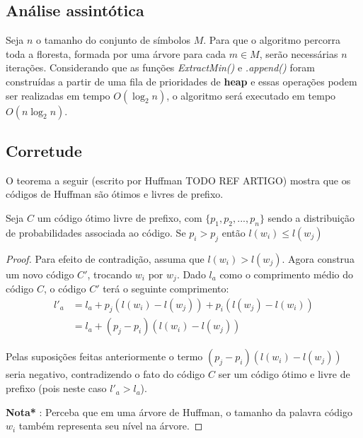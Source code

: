 \subsection{Análise assintótica}

Seja $n$ o tamanho do conjunto de símbolos $M$. Para que o algoritmo percorra toda a floresta, formada por uma árvore para cada $m \in M$, serão necessárias $n$ iterações. Considerando que as funções \emph{ExtractMin()} e \emph{.append()} foram construídas a partir de uma fila de prioridades de \textbf{heap} e essas operações podem ser realizadas em tempo $O(\log_2 n)$, o algoritmo será executado em tempo $O(n\log_2 n)$.

\subsection{Corretude}
O teorema a seguir (escrito por Huffman TODO REF ARTIGO) mostra  que os códigos de Huffman são ótimos e livres de prefixo.


\begin{lemma} \label{lemma:dist_prob_avg_size} Seja $C$ um código ótimo livre de prefixo, com $\{ p_1, p_2,..., p_n\}$ sendo a distribuição de probabilidades associada ao código. 
Se $p_i > p_j$ então $l(w_i) \leq l(w_j)$

\begin{proof} 
Para efeito de contradição, assuma que $l(w_i) > l(w_j)$. 
Agora construa um novo código $C'$, trocando $w_i$ por $w_j$. Dado $l_a$ como o comprimento médio do código $C$, o código $C'$ terá o seguinte comprimento:
\begin{align*}
l'_a &= l_a + p_j(l(w_i) - l(w_j)) + p_i(l(w_j) - l(w_i)) \\
&= l_a + (p_j - p_i)(l(w_i) - l(w_j)) 
\end{align*}

Pelas suposições feitas anteriormente o termo $(p_j - p_i)(l(w_i) - l(w_j))$ seria negativo, contradizendo o fato do código $C$ ser um código ótimo e livre de prefixo (pois neste caso $l'_a > l_a$).

\textbf{Nota*} : Perceba que em uma árvore de Huffman, o tamanho da palavra código $w_i$ também representa seu nível na árvore.
\end{proof}
\end{lemma}

